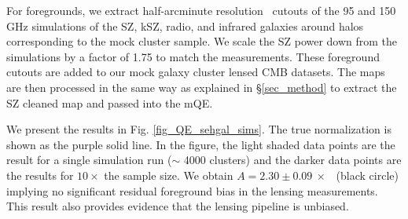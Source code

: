 For foregrounds, we extract half-arcminute resolution \boxsize\ cutouts of the 95 and 150 GHz \cite{sehgal10} simulations of the SZ, kSZ, radio, and infrared galaxies around halos corresponding to the mock cluster sample. %
We scale the SZ power down from the \cite{sehgal10} simulations by a factor of 1.75 to match the \citet{george15} measurements.
These foreground cutouts are added to our mock galaxy cluster lensed CMB datasets. %
The maps are then processed in the same way as explained in \S\ref{sec_method} to extract the SZ cleaned map and passed into the mQE. 


We present the results in Fig. \ref{fig_QE_sehgal_sims}.
The true normalization is shown as the purple solid line.
In the figure, the light shaded data points are the result for a single simulation run ($\sim$ 4000 clusters) and the darker data points are the results for $10\times$ the sample size. 
We obtain \mbox{$A = 2.30 \pm 0.09\ \times$ \munits} (black circle) implying no significant residual foreground bias in the lensing measurements.
This result also provides evidence that the lensing pipeline is unbiased.


